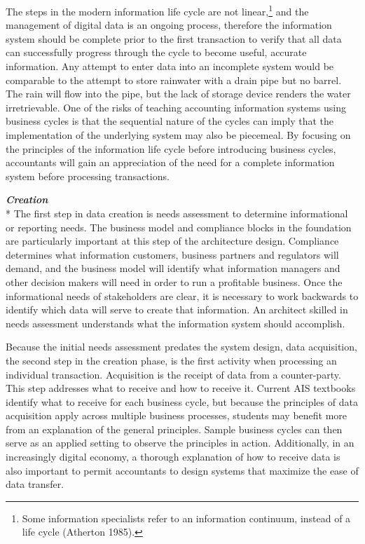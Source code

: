 \documentclass[12pt]{article}
\newcommand{\SubSubSection}[1]{{\centering{}\normalsize{}\textbf{\emph{#1}}}\\*\indent{}}
\begin{document}
The steps in the modern information life cycle are not linear,\footnote{Some information specialists refer to an information continuum, instead of a life cycle (Atherton 1985).} and the management of digital data is an ongoing process, therefore the information system should be complete prior to the first transaction to verify that all data can successfully progress through the cycle to become useful, accurate information. Any attempt to enter data into an incomplete system would be comparable to the attempt to store rainwater with a drain pipe but no barrel. The rain will flow into the pipe, but the lack of storage device renders the water irretrievable. One of the risks of teaching accounting information systems using business cycles is that the sequential nature of the cycles can imply that the implementation of the underlying system may also be piecemeal. By focusing on the principles of the information life cycle before introducing business cycles, accountants will gain an appreciation of the need for a complete information system before processing transactions.

\SubSubSection{Creation}
The first step in data creation is needs assessment to determine informational or reporting needs. The business model and compliance blocks in the foundation are particularly important at this step of the architecture design. Compliance determines what information customers, business partners and regulators will demand, and the business model will identify what information managers and other decision makers will need in order to run a profitable business. Once the informational needs of stakeholders are clear, it is necessary to work backwards to identify which data will serve to create that information. An architect skilled in needs assessment understands what the information system should accomplish.

Because the initial needs assessment predates the system design, data acquisition, the second step in the creation phase, is the first activity when processing an individual transaction. Acquisition is the receipt of data from a counter-party. This step addresses what to receive and how to receive it. Current AIS textbooks identify what to receive for each business cycle, but because the principles of data acquisition apply across multiple business processes, students may benefit more from an explanation of the general principles. Sample business cycles can then serve as an applied setting to observe the principles in action. Additionally, in an increasingly digital economy, a thorough explanation of how to receive data is also important to permit accountants to design systems that maximize the ease of data transfer.
\end{document}
